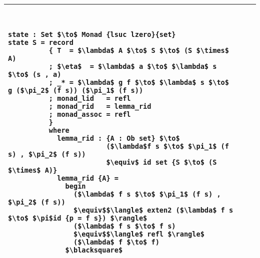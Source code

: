 \documentclass[../main.tex]{subfiles}
\begin{document}
\begin{tabular}{lll}
\toprule
{\tt
\begin{lstlisting}[mathescape]
state : Set $\to$ Monad {lsuc lzero}{set}
state S = record
          { T  = $\lambda$ A $\to$ S $\to$ (S $\times$ A)
          ; $\eta$  = $\lambda$ a $\to$ $\lambda$ s $\to$ (s , a)
          ; _* = $\lambda$ g f $\to$ $\lambda$ s $\to$ g ($\pi_2$ (f s)) ($\pi_1$ (f s))
          ; monad_lid   = refl
          ; monad_rid   = lemma_rid
          ; monad_assoc = refl
          }
          where
            lemma_rid : {A : Ob set} $\to$
                        ($\lambda$f s $\to$ $\pi_1$ (f s) , $\pi_2$ (f s))
                        $\equiv$ id set {S $\to$ (S $\times$ A)}
            lemma_rid {A} =
              begin
                ($\lambda$ f s $\to$ $\pi_1$ (f s) , $\pi_2$ (f s))
                $\equiv$$\langle$ exten2 ($\lambda$ f s $\to$ $\pi$id {p = f s}) $\rangle$
                ($\lambda$ f s $\to$ f s)
                $\equiv$$\langle$ refl $\rangle$
                ($\lambda$ f $\to$ f)
              $\blacksquare$
\end{lstlisting}
}
\\
\bottomrule
\end{tabular}
\end{document}
